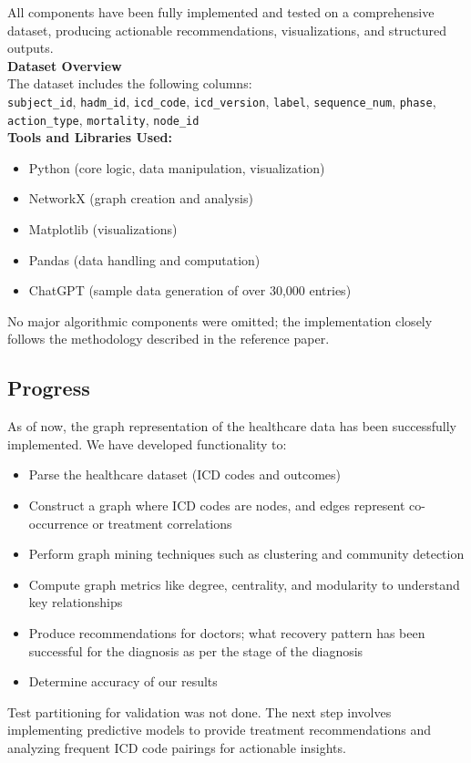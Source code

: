 \documentclass[10pt]{article}
\begin{document}
All components have been fully implemented and tested on a comprehensive dataset, producing actionable recommendations, visualizations, and structured outputs.\\
\textbf{Dataset Overview} \\
The dataset includes the following columns: \\
 \texttt{subject\_id}, \texttt{hadm\_id}, \texttt{icd\_code}, \texttt{icd\_version}, \texttt{label}, \texttt{sequence\_num}, \texttt{phase}, \texttt{action\_type}, \texttt{mortality}, \texttt{node\_id}
\\
\textbf{Tools and Libraries Used:}
\begin{itemize}[noitemsep]
    \item Python (core logic, data manipulation, visualization)
    \item NetworkX (graph creation and analysis)
    \item Matplotlib (visualizations)
    \item Pandas (data handling and computation)
    \item ChatGPT (sample data generation of over 30,000 entries)
\end{itemize}

No major algorithmic components were omitted; the implementation closely follows the methodology described in the reference paper.

\subsection*{Progress}
As of now, the graph representation of the healthcare data has been successfully implemented. We have developed functionality to:
\begin{itemize}[noitemsep]
    \item Parse the healthcare dataset (ICD codes and outcomes)
    \item Construct a graph where ICD codes are nodes, and edges represent co-occurrence or treatment correlations
    \item Perform graph mining techniques such as clustering and community detection
    \item Compute graph metrics like degree, centrality, and modularity to understand key relationships
    \item Produce recommendations for doctors; what recovery pattern has been successful for the diagnosis as per the stage of the diagnosis
    \item Determine accuracy of our results

\end{itemize}
Test partitioning for validation was not done. 
The next step involves implementing predictive models to provide treatment recommendations and analyzing frequent ICD code pairings for actionable insights.
\end{document}
